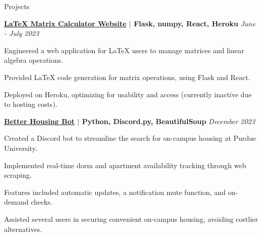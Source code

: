 \documentclass[
    11pt, %
]{resume} %
\begin{document}
\begin{rSection}{Projects}

    \begin{rSubsection}{}{}{\bf \href{https://github.com/maxinimus/LaTeX-Matrix-Calculator}{LaTeX Matrix Calculator Website} $\mid$ Flask, numpy, React, Heroku }{ \hfill \em June - July 2023}

        \item Engineered a web application for LaTeX users to manage matrices and linear algebra operations.
        \item Provided LaTeX code generation for matrix operations, using Flask and React.
        \item Deployed on Heroku, optimizing for usability and access (currently inactive due to hosting costs).
    \end{rSubsection}

    \begin{rSubsection}{}{}{\bf \href{https://github.com/maxinimus/better-housing-bot}{Better Housing Bot} $\mid$ Python, Discord.py, BeautifulSoup }{\hfill \em December 2023}
        \item Created a Discord bot to streamline the search for on-campus housing at Purdue University.
        \item Implemented real-time dorm and apartment availability tracking through web scraping.
        \item Features included automatic updates, a notification mute function, and on-demand checks.
        \item Assisted several users in securing convenient on-campus housing, avoiding costlier alternatives.
    \end{rSubsection}

\end{rSection}
\end{document}
